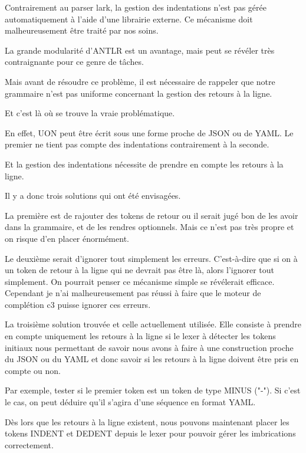\documentclass[
    iict, %
    il, %
]{heig-tb}
\begin{document}

Contrairement au parser lark, la gestion des indentations n'est pas gérée automatiquement à l'aide d'une librairie externe.
Ce mécanisme doit malheureusement être traité par nos soins.

La grande modularité d'ANTLR est un avantage, mais peut se révéler très contraignante pour ce genre de tâches.

Mais avant de résoudre ce problème, il est nécessaire de rappeler que notre grammaire n'est pas uniforme concernant la gestion des retours à la ligne. 

Et c'est là où se trouve la vraie problématique.

En effet, UON peut être écrit sous une forme proche de JSON ou de YAML. Le premier ne tient pas compte des indentations contrairement à la seconde.

Et la gestion des indentations nécessite de prendre en compte les retours à la ligne. %

Il y a donc trois solutions qui ont été envisagées.

La première est de rajouter des tokens de retour ou il serait jugé bon de les avoir dans la grammaire, et de les rendres optionnels.
Mais ce n'est pas très propre et on risque d'en placer énormément.

Le deuxième serait d'ignorer tout simplement les erreurs.  C'est-à-dire que si on à un token de retour à la ligne qui ne devrait pas être là, alors l'ignorer tout simplement.
On pourrait penser ce mécanisme simple se révélerait efficace. Cependant je n'ai malheureusement pas réussi à faire que le moteur de complétion c3
puisse ignorer ces erreurs.

La troisième solution trouvée et celle actuellement utilisée. Elle consiste à prendre en compte uniquement les retours à la ligne si le lexer à détecter les tokens initiaux
nous permettant de savoir nous avons à faire à une construction proche du JSON ou du YAML et donc savoir si les retours à la ligne doivent être pris en compte ou non.

Par exemple, tester si le premier token est un token de type MINUS ("-"). Si c'est le cas, on peut déduire qu'il s'agira d'une séquence en format YAML.

Dès lors que les retours à la ligne existent, nous pouvons maintenant placer les tokens INDENT et DEDENT depuis le lexer
pour pouvoir gérer les imbrications correctement.
\end{document}
